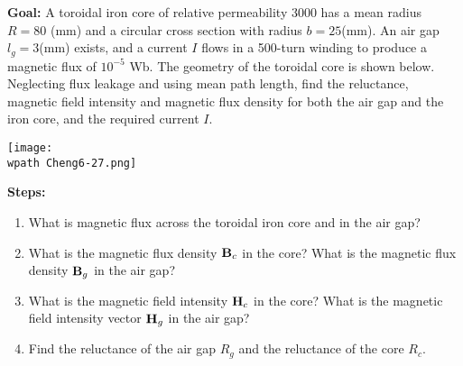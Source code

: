 \documentclass[../../header.tex]{subfiles}
\begin{document}
\textbf{Goal:} A toroidal iron core of relative permeability 3000 has a mean radius $R = 80$ (mm) and a circular cross section with radius $b = 25$(mm). An air gap $l_g = 3$(mm) exists, and a current $I$ flows in a 500-turn winding to produce a magnetic flux of $10^{-5}$ Wb. The geometry of the toroidal core is shown below. Neglecting flux leakage and using mean path length, find the reluctance, magnetic field intensity and magnetic flux density for both the air gap and the iron core, and the required current $I$. 
\begin{center}
\texttt{[image: \\wpath Cheng6-27.png]}
\end{center}
\textbf{Steps:} 
\begin{enumerate}
\item What is magnetic flux across the toroidal iron core and in the air gap?\\

\item What is the magnetic flux density $\mathbf{B}_c$ in the core? What is the magnetic flux density $\mathbf{B}_g$ in the air gap?\\

\item What is the magnetic field intensity $\mathbf{H}_c$ in the core? What is the magnetic field intensity vector $\mathbf{H}_g$ in the air gap?\\

\item Find the reluctance of the air gap $R_g$ and the reluctance of the core $R_c$.\\


\end{enumerate}
\end{document}

